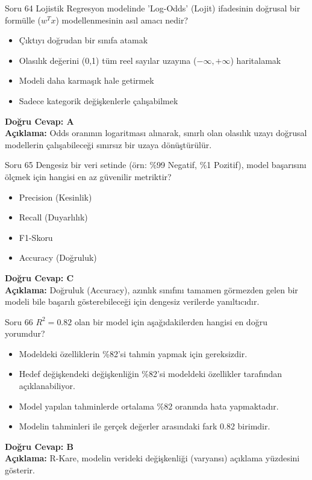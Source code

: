 \documentclass[12pt,a4paper]{article}
\begin{document}
\begin{testcard}{Soru 64}
    Lojistik Regresyon modelinde 'Log-Odds' (Lojit) ifadesinin doğrusal bir formülle ($w^T x$) modellenmesinin asıl amacı nedir?
    \begin{itemize}
        \item[A)] Çıktıyı doğrudan bir sınıfa atamak
        \item[B)] Olasılık değerini (0,1) tüm reel sayılar uzayına ($-\infty, +\infty$) haritalamak
        \item[C)] Modeli daha karmaşık hale getirmek
        \item[D)] Sadece kategorik değişkenlerle çalışabilmek
    \end{itemize}
    \tcblower
    \textbf{Doğru Cevap: A} \\
    \textbf{Açıklama:} Odds oranının logaritması alınarak, sınırlı olan olasılık uzayı doğrusal modellerin çalışabileceği sınırsız bir uzaya dönüştürülür.
\end{testcard}

\begin{testcard}{Soru 65}
    Dengesiz bir veri setinde (örn: \%99 Negatif, \%1 Pozitif), model başarısını ölçmek için hangisi en az güvenilir metriktir?
    \begin{itemize}
        \item[A)] Precision (Kesinlik)
        \item[B)] Recall (Duyarlılık)
        \item[C)] F1-Skoru
        \item[D)] Accuracy (Doğruluk)
    \end{itemize}
    \tcblower
    \textbf{Doğru Cevap: C} \\
    \textbf{Açıklama:} Doğruluk (Accuracy), azınlık sınıfını tamamen görmezden gelen bir modeli bile başarılı gösterebileceği için dengesiz verilerde yanıltıcıdır.
\end{testcard}

\begin{testcard}{Soru 66}
    $R^2 = 0.82$ olan bir model için aşağıdakilerden hangisi en doğru yorumdur?
    \begin{itemize}
        \item[A)] Modeldeki özelliklerin \%82'si tahmin yapmak için gereksizdir.
        \item[B)] Hedef değişkendeki değişkenliğin \%82'si modeldeki özellikler tarafından açıklanabiliyor.
        \item[C)] Model yapılan tahminlerde ortalama \%82 oranında hata yapmaktadır.
        \item[D)] Modelin tahminleri ile gerçek değerler arasındaki fark 0.82 birimdir.
    \end{itemize}
    \tcblower
    \textbf{Doğru Cevap: B} \\
    \textbf{Açıklama:} R-Kare, modelin verideki değişkenliği (varyansı) açıklama yüzdesini gösterir.
\end{testcard}
\end{document}
